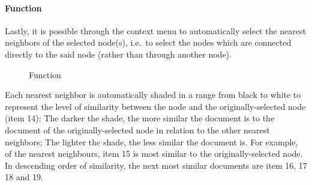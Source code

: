 \paragraph{ Function}
Lastly, it is possible through the context menu to automatically select the nearest neighbors of the selected node(s), i.e.\ to select the nodes which are connected directly to the said node (rather than through another node).

\begin{figure}[ht]
\centering
\caption{ Function}
\end{figure}

Each nearest neighbor is automatically shaded in a range from black to white to represent the level of similarity between the node and the originally-selected node (item 14): The darker the shade, the more similar the document is to the document of the originally-selected node in relation to the other nearest neighbors; The lighter the shade, the less similar the document is. For example, of the nearest neighbours, item 15 is most similar to the originally-selected node. In descending order of similarity, the next most similar documents are item 16, 17 18 and 19.

